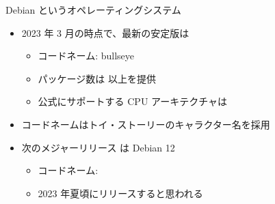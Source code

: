 \begin{frame}{Debian というオペレーティングシステム}
  \begin{itemize}
  \item 2023 年 3 月の時点で、最新の安定版は {\color{red}{Debian 11.6}}
    \begin{itemize}
    \item コードネーム: bullseye
    \item パッケージ数は {\color{red}{約59,551}} 以上を提供
    \item 公式にサポートする CPU アーキテクチャは {\color{red}{9 つ}}
    \end{itemize}
  \item コードネームはトイ・ストーリーのキャラクター名を採用
  \item 次のメジャーリリース は Debian 12
    \begin{itemize}
    \item コードネーム: {\color{red}{bookworm}}
    \item 2023 年夏頃にリリースすると思われる
    \end{itemize}
\end{itemize}

\end{frame}


